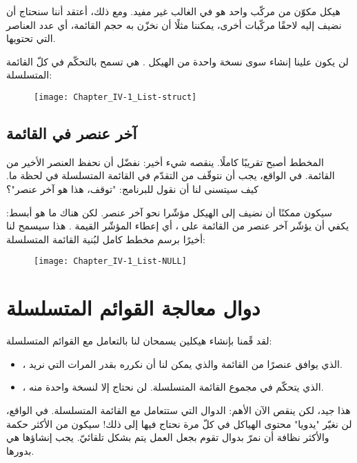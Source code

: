 \begin{information}
هيكل مكوّن من مركّب واحد هو في الغالب غير مفيد. ومع ذلك، أعتقد أننا سنحتاج أن نضيف إليه لاحقًا مركّبات أخرى، يمكننا مثلًا أن نخزّن به حجم القائمة، أي عدد العناصر التي تحتويها.
\end{information}

لن يكون علينا إنشاء سوى نسخة واحدة من الهيكل
.
هي تسمح بالتحكّم في كلّ القائمة المتسلسلة:
 
\begin{figure}[H]
	\centering
	\texttt{[image: Chapter\_IV-1\_List-struct]}
\end{figure}

\subsection{آخر عنصر في القائمة}

المخطط أصبح تقريبًا كاملًا. ينقصه شيء أخير: نفضّل أن نحفظ العنصر الأخير من القائمة. في الواقع، يجب أن نتوقّف من التقدّم في القائمة المتسلسلة في لحظة ما. كيف سيتسنى لنا أن نقول للبرنامج: "توقف، هذا هو آخر عنصر"؟

سيكون ممكنًا أن نضيف إلى الهيكل 
مؤشّرا نحو آخر عنصر. لكن هناك ما هو أبسط: يكفي أن يؤشّر آخر عنصر من القائمة على
،
أي إعطاء المؤشّر
القيمة
.
هذا سيسمح لنا أخيرًا برسم مخطط كامل لبُنية القائمة المتسلسلة:

\begin{figure}[H]
	\centering
	\texttt{[image: Chapter\_IV-1\_List-NULL]}
\end{figure}

\section{دوال معالجة القوائم المتسلسلة}

لقد قًمنا بإنشاء هيكلين يسمحان لنا بالتعامل مع القوائم المتسلسلة:

\begin{itemize}
	\item {}،
	الذي يوافق عنصرًا من القائمة والذي يمكن لنا أن نكرره بقدر المرات التي نريد.
	\item {}،
	الذي يتحكّم في مجموع القائمة المتسلسلة. لن نحتاج إلا لنسخة واحدة منه.
\end{itemize}

هذا جيد، لكن ينقص الآن الأهم: الدوال التي ستتعامل مع القائمة المتسلسلة. في الواقع، لن نغيّر "يدويا" محتوى الهياكل في كلّ مرة نحتاج فيها إلى ذلك! سيكون من الأكثر حكمة والأكثر نظافة أن نمرّ بدوال تقوم بجعل العمل يتم بشكل تلقائيّ. يجب إنشاؤها هي بدورها.

